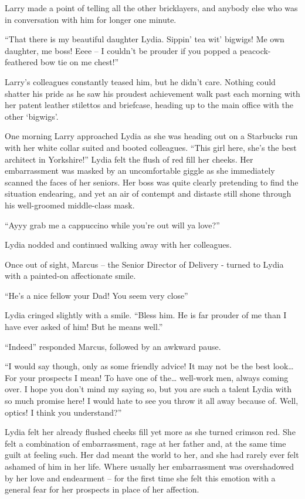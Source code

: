 Larry made a point of telling all the other bricklayers, and anybody
else who was in conversation with him for longer one minute.

“That there is my beautiful daughter Lydia. Sippin’ tea wit’ bigwigs!
Me own daughter, me boss! Eeee – I couldn't be prouder if you popped a
peacock-feathered bow tie on me chest!”

Larry's colleagues constantly teased him, but he didn't care. Nothing
could shatter his pride as he saw his proudest achievement walk past
each morning with her patent leather stilettos and briefcase, heading
up to the main office with the other ‘bigwigs’.

One morning Larry approached Lydia as she was heading out on a
Starbucks run with her white collar suited and booted
colleagues. “This girl here, she's the best architect in Yorkshire!”
Lydia felt the flush of red fill her cheeks. Her embarrassment was
masked by an uncomfortable giggle as she immediately scanned the faces
of her seniors. Her boss was quite clearly pretending to find the
situation endearing, and yet an air of contempt and distaste still
shone through his well-groomed middle-class mask.

“Ayyy grab me a cappuccino while you're out will ya love?”

Lydia nodded and continued walking away with her colleagues.

Once out of sight, Marcus – the Senior Director of Delivery - turned
to Lydia with a painted-on affectionate smile.

“He’s a nice fellow your Dad! You seem very close”

Lydia cringed slightly with a smile. “Bless him. He is far prouder of
me than I have ever asked of him! But he means well.”

“Indeed” responded Marcus, followed by an awkward pause.

“I would say though, only as some friendly advice! It may not be the
best look… For your prospects I mean! To have one of the… well-work
men, always coming over. I hope you don’t mind my saying so, but you
are such a talent Lydia with so much promise here! I would hate to see
you throw it all away because of. Well, optics! I think you
understand?”

Lydia felt her already flushed cheeks fill yet more as she turned
crimson red. She felt a combination of embarrassment, rage at her
father and, at the same time guilt at feeling such. Her dad meant the
world to her, and she had rarely ever felt ashamed of him in her
life. Where usually her embarrassment was overshadowed by her love and
endearment – for the first time she felt this emotion with a general
fear for her prospects in place of her affection.

